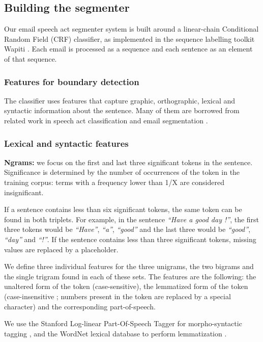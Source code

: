 \subsection{Building the segmenter}


Our email speech act segmenter system is built around a linear-chain Conditional Random Field (CRF) classifier, as implemented in the sequence labelling toolkit Wapiti \cite{lavergne2010practical}. Each email is processed as a sequence and each sentence as an element of that sequence.

\subsubsection{Features for boundary detection}

The classifier uses features that capture graphic, orthographic, lexical and syntactic information about the sentence. Many of them are borrowed from related work in speech act classification \cite{qadir2011classifying} and email segmentation \cite{lampert2009segmenting}.

\subsubsection{Lexical and syntactic features}

\textbf{Ngrams:} we focus on the first and last three significant tokens in the sentence. Significance is determined by the number of occurrences of the token in the training corpus: terms with a frequency lower than  1/X are considered insignificant. 

If a sentence contains less than six significant tokens, the same token can be found in both triplets. For example, in the sentence \textit{``Have a good day !''}, the first three tokens would be \textit{``Have''}, \textit{``a''}, \textit{``good''} and the last three would be \textit{``good''}, \textit{``day''} and \textit{``!''}. If the sentence contains less than three significant tokens, missing values are replaced by a placeholder.

We define three individual features for the three unigrams, the two bigrams and the single trigram found in each of these sets. The features are the following: the unaltered form of the token (case-sensitive), the lemmatized form of the token (case-insensitive ; numbers present in the token are replaced by a special character) and the corresponding part-of-speech.

We use the Stanford Log-linear Part-Of-Speech Tagger for morpho-syntactic tagging \cite{toutanova2003feature}, and the WordNet lexical database to perform lemmatization \cite{miller1995wordnet}.

